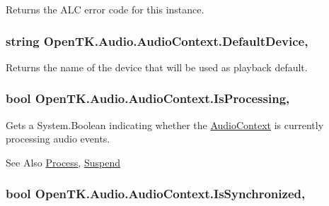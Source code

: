 Returns the A\-L\-C error code for this instance. 

\hypertarget{class_open_t_k_1_1_audio_1_1_audio_context_a9d503b9eaaca60548894f74113f897a1}{
\subsubsection[{Default\-Device}]{\setlength{\rightskip}{0pt plus 5cm}string Open\-T\-K.\-Audio.\-Audio\-Context.\-Default\-Device\hspace{0.3cm}{\ttfamily [static]}, {\ttfamily [get]}}}\label{class_open_t_k_1_1_audio_1_1_audio_context_a9d503b9eaaca60548894f74113f897a1}


Returns the name of the device that will be used as playback default. 

\hypertarget{class_open_t_k_1_1_audio_1_1_audio_context_a24dfcaa456f5c1d8ce6ac0d7a1858d18}{
\subsubsection[{Is\-Processing}]{\setlength{\rightskip}{0pt plus 5cm}bool Open\-T\-K.\-Audio.\-Audio\-Context.\-Is\-Processing\hspace{0.3cm}{\ttfamily [get]}, {\ttfamily [set]}}}\label{class_open_t_k_1_1_audio_1_1_audio_context_a24dfcaa456f5c1d8ce6ac0d7a1858d18}


Gets a System.\-Boolean indicating whether the \hyperlink{class_open_t_k_1_1_audio_1_1_audio_context}{Audio\-Context} is currently processing audio events. 

\begin{DoxySeeAlso}{See Also}
\hyperlink{class_open_t_k_1_1_audio_1_1_audio_context_af396e510f2039ee580a0d21a20304956}{Process}, \hyperlink{class_open_t_k_1_1_audio_1_1_audio_context_a62417c8652bc1f7c22bf9a1cf83ed115}{Suspend}


\end{DoxySeeAlso}
\hypertarget{class_open_t_k_1_1_audio_1_1_audio_context_aa1f3721b71e83da2c94d637eab4fbbcf}{
\subsubsection[{Is\-Synchronized}]{\setlength{\rightskip}{0pt plus 5cm}bool Open\-T\-K.\-Audio.\-Audio\-Context.\-Is\-Synchronized\hspace{0.3cm}{\ttfamily [get]}, {\ttfamily [set]}}}\label{class_open_t_k_1_1_audio_1_1_audio_context_aa1f3721b71e83da2c94d637eab4fbbcf}


